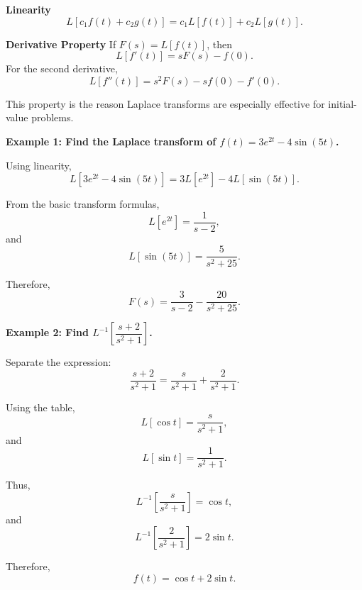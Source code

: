 \begin{conceptbox}
    \textbf{Linearity}
    \[
        L[c_1f(t)+c_2g(t)]
        =
        c_1L[f(t)]+c_2L[g(t)].
    \]
\end{conceptbox}

\begin{conceptbox}
    \textbf{Derivative Property}
    If $F(s)=L[f(t)]$, then
    \[
        L[f'(t)] = sF(s)-f(0).
    \]
    For the second derivative,
    \[
        L[f''(t)] = s^2F(s)-sf(0)-f'(0).
    \]
\end{conceptbox}

This property is the reason Laplace transforms are especially effective for initial-value problems.

\begin{examplebox}
    \textbf{Example 1: Find the Laplace transform of $f(t)=3e^{2t}-4\sin(5t)$.}

    Using linearity,
    \[
        L[3e^{2t}-4\sin(5t)]
        =
        3L[e^{2t}]-4L[\sin(5t)].
    \]

    From the basic transform formulas,
    \[
        L[e^{2t}]=\frac{1}{s-2},
    \]
    and
    \[
        L[\sin(5t)]=\frac{5}{s^2+25}.
    \]

    Therefore,
    \[
        F(s)=\frac{3}{s-2}-\frac{20}{s^2+25}.
    \]
\end{examplebox}

\begin{examplebox}
    \textbf{Example 2: Find $L^{-1}\left[\dfrac{s+2}{s^2+1}\right]$.}

    Separate the expression:
    \[
        \frac{s+2}{s^2+1}
        =
        \frac{s}{s^2+1}
        +
        \frac{2}{s^2+1}.
    \]

    Using the table,
    \[
        L[\cos t]=\frac{s}{s^2+1},
    \]
    and
    \[
        L[\sin t]=\frac{1}{s^2+1}.
    \]

    Thus,
    \[
        L^{-1}\left[\frac{s}{s^2+1}\right]=\cos t,
    \]
    and
    \[
        L^{-1}\left[\frac{2}{s^2+1}\right]=2\sin t.
    \]

    Therefore,
    \[
        f(t)=\cos t+2\sin t.
    \]
\end{examplebox}

